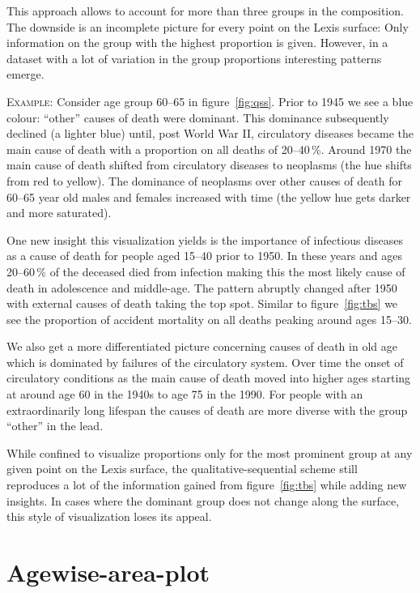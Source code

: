 \documentclass[parskip=half]{scrartcl}
\begin{document}
This approach allows to account for more than three groups in the composition. The downside is an incomplete picture for every point on the Lexis surface: Only information on the group with the highest proportion is given. However, in a dataset with a lot of variation in the group proportions interesting patterns emerge.

\textsc{Example:} Consider age group 60--65 in figure~\ref{fig:qss}. Prior to 1945 we see a blue colour: \enquote{other} causes of death were dominant. This dominance subsequently declined (a lighter blue) until, post World War II, circulatory diseases became the main cause of death with a proportion on all deaths of 20--40\,\%. Around 1970 the main cause of death shifted from circulatory diseases to neoplasms (the hue shifts from red to yellow). The dominance of neoplasms over other causes of death for 60--65 year old males and females increased with time (the yellow hue gets darker and more saturated).

One new insight this visualization yields is the importance of infectious diseases as a cause of death for people aged 15--40 prior to 1950. In these years and ages 20--60\,\% of the deceased died from infection making this the most likely cause of death in adolescence and middle-age. The pattern abruptly changed after 1950 with external causes of death taking the top spot. Similar to figure~\ref{fig:tbs} we see the proportion of accident mortality on all deaths peaking around ages 15--30.

We also get a more differentiated picture concerning causes of death in old age which is dominated by failures of the circulatory system. Over time the onset of circulatory conditions as the main cause of death moved into higher ages starting at around age 60 in the 1940s to age 75 in the 1990. For people with an extraordinarily long lifespan the causes of death are more diverse with the group \enquote{other} in the lead.

While confined to visualize proportions only for the most prominent group at any given point on the Lexis surface, the qualitative-sequential scheme still reproduces a lot of the information gained from figure~\ref{fig:tbs} while adding new insights. In cases where the dominant group does not change along the surface, this style of visualization loses its appeal.

\clearpage

\section{Agewise-area-plot} %
\label{sec:aag}
\end{document}
